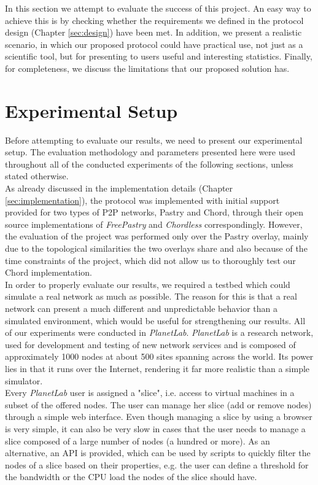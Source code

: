 \documentclass[a4paper,11pt,twoside]{report}
\begin{document}
In this section we attempt to evaluate the success of this project. An easy way to achieve this is by checking whether the requirements we defined in the protocol design (Chapter \ref{sec:design}) have been met. In addition, we present a realistic scenario, in which our proposed protocol could have practical use, not just as a scientific tool, but for presenting to users useful and interesting statistics. Finally, for completeness, we discuss the limitations that our proposed solution has.

\section{Experimental Setup}

Before attempting to evaluate our results, we need to present our experimental setup. The evaluation methodology and parameters presented here were used throughout all of the conducted experiments of the following sections, unless stated otherwise.\\

As already discussed in the implementation details (Chapter \ref{sec:implementation}), the protocol was implemented with initial support provided for two types of P2P networks, Pastry and Chord, through their open source implementations of \textit{FreePastry} and \textit{Chordless} correspondingly. However, the evaluation of the project was performed only over the Pastry overlay, mainly due to the topological similarities the two overlays share and also because of the time constraints of the project, which did not allow us to thoroughly test our Chord implementation.\\

In order to properly evaluate our results, we required a testbed which could simulate a real network as much as possible. The reason for this is that a real network can present a much different and unpredictable behavior than a simulated environment, which would be useful for strengthening our results. All of our experiments were conducted in \textit{PlanetLab}. \textit{PlanetLab} is a research network, used for development and testing of new network services and is composed of approximately 1000 nodes at about 500 sites spanning across the world. Its power lies in that it runs over the Internet, rendering it far more realistic than a simple simulator.\\

Every \textit{PlanetLab} user is assigned a "slice", i.e. access to virtual machines in a subset of the offered nodes. The user can manage her slice (add or remove nodes) through a simple web interface. Even though managing a slice by using a browser is very simple, it can also be very slow in cases that the user needs to manage a slice composed of a large number of nodes (a hundred or more). As an alternative, an  API is provided, which can be used by scripts to quickly filter the nodes of a slice based on their properties, e.g. the user can define a threshold for the bandwidth or the CPU load the nodes of the slice should have.\\
\end{document}
